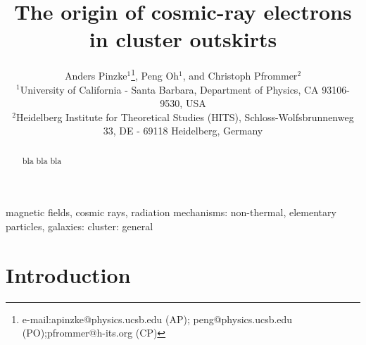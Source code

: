 \documentclass[useAMS,usenatbib]{mn2e}
\title{The origin of cosmic-ray electrons in cluster outskirts}
\author[A. Pinzke, P. Oh and C. Pfrommer] 
  {Anders Pinzke$^1$\thanks{e-mail:apinzke@physics.ucsb.edu (AP); peng@physics.ucsb.edu (PO);pfrommer@h-its.org (CP)}, Peng Oh$^1$\footnotemark[1],
    and Christoph Pfrommer$^2$\footnotemark[1]\\
    $^1$University of California - Santa Barbara,
  Department of Physics, CA 93106-9530, USA\\
    $^2$Heidelberg Institute for Theoretical Studies
  (HITS), Schloss-Wolfsbrunnenweg 33, DE - 69118 Heidelberg, Germany}
\begin{document}
\pagerange{\pageref{firstpage}--\pageref{lastpage}} 
\maketitle
\label{firstpage}


\begin{abstract}
  bla bla bla
\end{abstract}


\begin{keywords}
  magnetic fields, cosmic rays, radiation mechanisms: non-thermal, elementary
  particles, galaxies: cluster: general
\end{keywords}

\section{Introduction}
\end{document}
